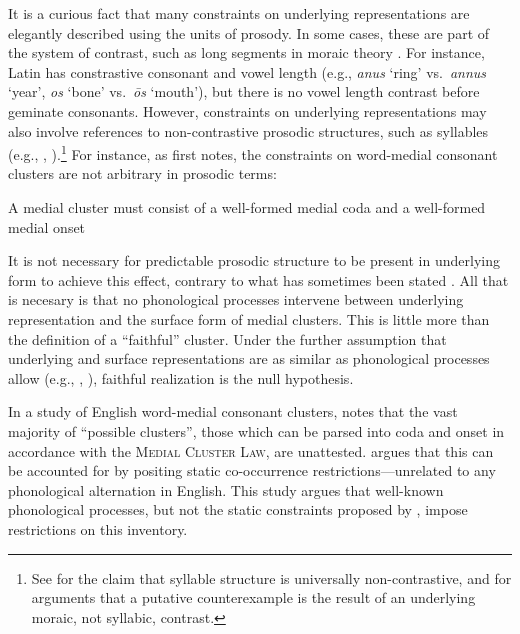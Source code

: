 \label{gaps} 

It is a curious fact that many constraints on underlying representations are elegantly described using the units of prosody.
In some cases, these are part of the system of contrast, such as long segments in moraic theory \citep[e.g.,][]{Davis1999}. For instance, Latin has constrastive consonant and vowel length (e.g., \emph{anus} `ring' vs.~\emph{annus} `year', \emph{os} `bone' vs.~\emph{ōs} `mouth'), but there is no vowel length contrast before geminate consonants. However, constraints on underlying representations may also involve references to non-contrastive prosodic structures, such as syllables (e.g., \citealt{Hooper1973}, \citealt{Kahn1976}).\footnote{See \citealt{Blevins1995} for the claim that syllable structure is universally non-contrastive, and \citealt{Elfner2006} for arguments that a putative counterexample is the result of an underlying moraic, not syllabic, contrast.}
For instance, as \citeauthor{Haugen1956} first notes, the constraints on word-medial consonant clusters are not arbitrary in prosodic terms:

\begin{example}
\label{mcl}
A medial cluster must consist of a well-formed medial coda and a well-formed medial onset
\end{example}

\noindent
It is not necessary for predictable prosodic structure to be present in underlying form to achieve this effect, contrary to what has sometimes been stated \citep[e.g.,][255]{A74}.
All that is necesary is that no phonological processes intervene between underlying representation and the surface form of medial clusters.
This is little more than the definition of a ``faithful'' cluster.
Under the further assumption that underlying and surface representations are as similar as phonological processes allow (e.g., \citealt[205f.]{Dell1973}, \citealt[28f.]{Stampe1973}), faithful realization is the null hypothesis.

In a study of English word-medial consonant clusters, \citet{Pierrehumbert1994} notes that the vast majority of ``possible clusters'', those which can be parsed into coda and onset in accordance with the \textsc{Medial Cluster Law}, are unattested.
\citeauthor{Pierrehumbert1994} argues that this can be accounted for by positing static co-occurrence restrictions---unrelated to any phonological alternation in English.
This study argues that well-known phonological processes, but not the static constraints proposed by \citeauthor{Pierrehumbert1994}, impose restrictions on this inventory.

